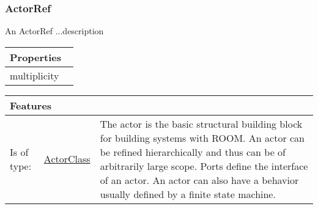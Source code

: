 		\subsubsection{ActorRef}
			\hypertarget{ref:ActorRef}{}
			
			An ActorRef ...description
			
			\vspace{\baselineskip}
			\begingroup
			\renewcommand{\arraystretch}{1.8} %
			\parbox{\textwidth}{
			\begin{longtable}{l p{}}
				\multicolumn{2}{l}{\textbf{\large Properties}} \\
				\hline
			\tabitem multiplicity & \\
			\end{longtable}	
			}
			\endgroup
			\vspace{\baselineskip}
			
			\vspace{\baselineskip}
			\begingroup
			\renewcommand{\arraystretch}{1.8} %
			\parbox{\textwidth}{
			\begin{longtable}{l l p{}}
				\multicolumn{2}{l}{\textbf{\large Features}} & \\
				\hline
			Is of type: & \tabitem \hyperlink{ref:ActorClass}{ActorClass}  & The actor is the basic structural building block for building systems with ROOM. An actor can be refined hierarchically and thus can be of arbitrarily large scope. Ports define the interface of an actor. An actor can also have a behavior usually defined by a finite state machine. \\
			\hline
			\end{longtable}	
			}
			\endgroup
			\vspace{\baselineskip}
			
